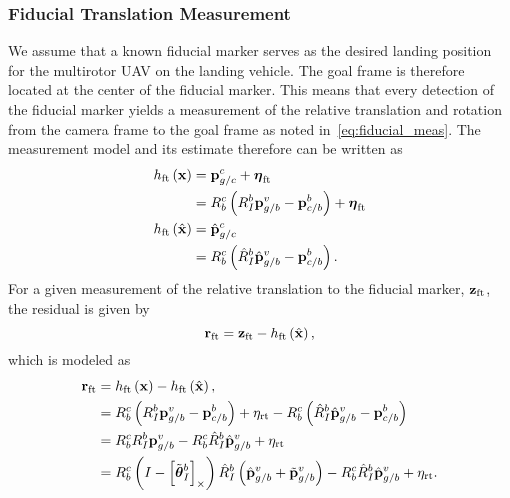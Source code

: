 \subsubsection{Fiducial Translation Measurement}
We assume that a known fiducial marker serves as the desired landing position
for the multirotor UAV on the landing vehicle. The goal frame is therefore
located at the center of the fiducial marker. This means that every detection of the fiducial
marker yields a measurement of the relative translation and rotation from the
camera frame to the goal frame as noted in~\eqref{eq:fiducial_meas}.
The measurement model and its estimate
therefore can be written as
\begin{align}
  h_{\text{ft}} \left( \boldsymbol{\mathrm{x}} \right) &=
  \boldsymbol{\mathrm{p}}_{g/c}^c + \boldsymbol{\mathrm{\eta}}_{\text{ft}} \\
  &= R_b^c \left( R_I^b \boldsymbol{\mathrm{p}}_{g/b}^v -
  \boldsymbol{\mathrm{p}}_{c/b}^b \right) + \boldsymbol{\mathrm{\eta}}_{\text{ft}} \\
  h_{\text{ft}} \left( \hat{\boldsymbol{\mathrm{x}}} \right) &=
    \hat{\boldsymbol{\mathrm{p}}}_{g/c}^c \\
  &= R_b^c \left( \hat{R}_I^b \hat{\boldsymbol{\mathrm{p}}}_{g/b}^v -
    \boldsymbol{\mathrm{p}}_{c/b}^b \right). 
\end{align}
For a given measurement of the relative translation to the fiducial marker,
$\boldsymbol{\mathrm{z}}_{\text{ft}}$, the residual is given by
\begin{equation*}
  \boldsymbol{\mathrm{r}}_{\text{ft}} = \boldsymbol{\mathrm{z}}_{\text{ft}} - h_{\text{ft}} \left( \hat{\boldsymbol{\mathrm{x}}}
  \right),
\end{equation*}
which is modeled as
\begin{align*}
  \boldsymbol{\mathrm{r}}_{\text{ft}} &=  h_{\text{ft}} \left( \boldsymbol{\mathrm{x}} \right) - h_{\text{ft}} \left( \hat{\boldsymbol{\mathrm{x}}}
  \right), \\
                       &= R_b^c \left( R_I^b \boldsymbol{\mathrm{p}}_{g/b}^v -
                         \boldsymbol{\mathrm{p}}_{c/b}^b \right)  +\eta_{\text{rt}} - R_b^c \left( \hat{R}_I^b \hat{\boldsymbol{\mathrm{p}}}_{g/b}^v -
    \boldsymbol{\mathrm{p}}_{c/b}^b \right)  \\
                       &= R_b^c R_I^b \boldsymbol{\mathrm{p}}_{g/b}^v 
                          - R_b^c \hat{R}_I^b \hat{\boldsymbol{\mathrm{p}}}_{g/b}^v +
                          \eta_{\text{rt}} \\
                       &= R_b^c \left( I - \left[ \tilde{\boldsymbol{\mathrm{\theta}}}_I^b  \right]_{\times}\right) \hat{R}_I^b \left( \hat{\boldsymbol{\mathrm{p}}}_{g/b}^v + \tilde{\boldsymbol{\mathrm{p}}}_{g/b}^v \right) 
                          - R_b^c \hat{R}_I^b \hat{\boldsymbol{\mathrm{p}}}_{g/b}^v +
                          \eta_{\text{rt}}.
\end{align*}
